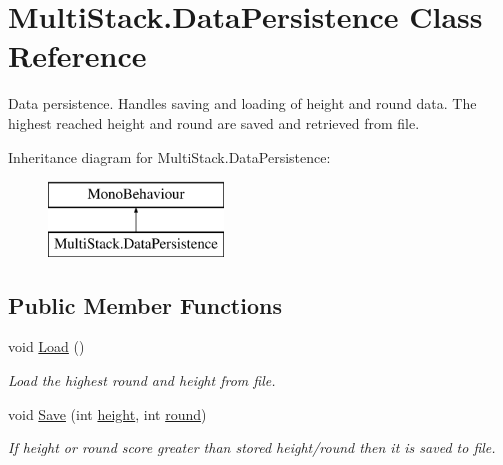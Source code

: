 \hypertarget{class_multi_stack_1_1_data_persistence}{}\section{Multi\+Stack.\+Data\+Persistence Class Reference}
\label{class_multi_stack_1_1_data_persistence}


Data persistence. Handles saving and loading of height and round data. The highest reached height and round are saved and retrieved from file.  


Inheritance diagram for Multi\+Stack.\+Data\+Persistence\+:\begin{figure}[H]
\begin{center}
\leavevmode
\includegraphics[height=2.000000cm]{class_multi_stack_1_1_data_persistence}
\end{center}
\end{figure}
\subsection*{Public Member Functions}
\begin{DoxyCompactItemize}
\item 
void \hyperlink{class_multi_stack_1_1_data_persistence_a7c9f8ba349cd66a0bc6881fe2d1cc0f7}{Load} ()
\begin{DoxyCompactList}\small\item\em Load the highest round and height from file. \end{DoxyCompactList}\item 
void \hyperlink{class_multi_stack_1_1_data_persistence_a9fc99e077a4fe5b2a49d8508c25d2edd}{Save} (int \hyperlink{class_multi_stack_1_1_data_persistence_af7a5c84c3775aa714c16b32ffc052369}{height}, int \hyperlink{class_multi_stack_1_1_data_persistence_a964cbc11f47af6acf898c8e4d1e3c2fe}{round})
\begin{DoxyCompactList}\small\item\em If height or round score greater than stored height/round then it is saved to file. \end{DoxyCompactList}\end{DoxyCompactItemize}
